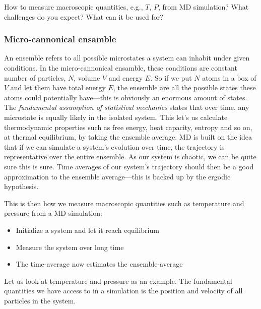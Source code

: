 \documentclass[a4paper, 11pt, notitlepage, english]{article}
\begin{document}
How to measure macroscopic quantities, e.g., $T$, $P$, from MD simulation? What challenges do you expect? What can it be used for?

\subsubsection*{Micro-cannonical ensamble}

An ensemble refers to all possible microstates a system can inhabit under given conditions. In the micro-cannonical ensamble, these conditions are constant number of particles, $N$, volume $V$ and energy $E$. So if we put $N$ atoms in a box of $V$ and let them have total energy $E$, the ensemble are all the possible states these atoms could potentially have---this is obviously an enormous amount of states. The \emph{fundamental assumption of statistical mechanics} states that over time, any microstate is equally likely in the isolated system. This let's us calculate thermodynamic properties such as free energy, heat capacity, entropy and so on, at thermal equilibrium, by taking the ensemble average. MD is built on the idea that if we can simulate a system's evolution over time, the trajectory is representative over the entire ensemble. As our system is chaotic, we can be quite sure this is sure. Time averages of our system's trajectory should then be a good approximation to the ensemble average---this is backed up by the ergodic hypothesis.

This is then how we measure macroscopic quantities such as temperature and pressure from a MD simulation:
\begin{itemize}
	\item Initialize a system and let it reach equilibrium
	\item Measure the system over long time
	\item The time-average now estimates the ensemble-average
\end{itemize}
Let us look at temperature and pressure as an example. The fundamental quantities we have access to in a simulation is the position and velocity of all particles in the system.
\end{document}
